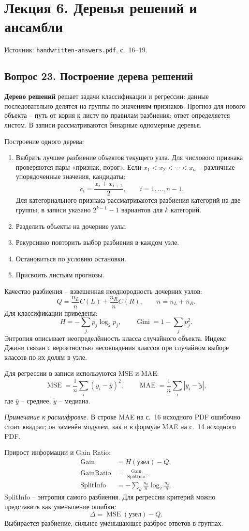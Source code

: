 \documentclass[11pt,a4paper]{article}
\newcommand{\source}[1]{{\small\color{muted}Источник: \texttt{handwritten-answers.pdf}, с.~#1.}\par}
\newcommand{\ednote}[1]{\par{\small\color{muted}\textit{Примечание к расшифровке.} #1}\par}
\newcommand{\question}[2]{\subsection{Вопрос #1. #2}}
\newcommand{\MSE}{\operatorname{MSE}}
\newcommand{\MAE}{\operatorname{MAE}}
\begin{document}
\clearpage
\section{Лекция 6. Деревья решений и ансамбли}
\source{16--19}

\question{23}{Построение дерева решений}
\textbf{Дерево решений} решает задачи классификации и регрессии:
данные последовательно делятся на группы по значениям признаков.
Прогноз для нового объекта -- путь от корня к листу по правилам разбиения;
ответ определяется листом. В записи рассматриваются бинарные одномерные деревья.

Построение одного дерева:
\begin{enumerate}
\item Выбрать лучшее разбиение объектов текущего узла.
Для числового признака проверяются пары «признак, порог».
Если $x_1<x_2<\cdots<x_n$ -- различные упорядоченные значения, кандидаты:
\[
 c_i=\frac{x_i+x_{i+1}}2,\qquad i=1,\ldots,n-1.
\]
Для категориального признака рассматриваются разбиения категорий на две группы;
в записи указано $2^{k-1}-1$ вариантов для $k$ категорий.
\item Разделить объекты на дочерние узлы.
\item Рекурсивно повторить выбор разбиения в каждом узле.
\item Остановиться по условию остановки.
\item Присвоить листьям прогнозы.
\end{enumerate}

Качество разбиения -- взвешенная неоднородность дочерних узлов:
\[
 Q=\frac{n_L}{n}C(L)+\frac{n_R}{n}C(R),\qquad n=n_L+n_R.
\]
Для классификации приведены:
\[
 H=-\sum_jp_j\log_2p_j,\qquad
 \operatorname{Gini}=1-\sum_jp_j^2.
\]
Энтропия описывает неопределённость класса случайного объекта.
Индекс Джини связан с вероятностью несовпадения классов при случайном выборе
классов по их долям в узле.

Для регрессии в записи используются MSE и MAE:
\[
 \MSE=\frac1n\sum_i(y_i-\bar y)^2,\qquad
 \MAE=\frac1n\sum_i|y_i-\widetilde y|,
\]
где $\bar y$ -- среднее, $\widetilde y$ -- медиана.
\ednote{В строке MAE на с.~16 исходного PDF ошибочно стоит квадрат;
он заменён модулем, как и в формуле MAE на с.~14 исходного PDF.}

Прирост информации и Gain Ratio:
\begin{align*}
 \operatorname{Gain}&=H(\text{узел})-Q,\\
 \operatorname{GainRatio}&=\frac{\operatorname{Gain}}{\operatorname{SplitInfo}},\\
 \operatorname{SplitInfo}&=-\sum_k\frac{n_k}{n}\log_2\frac{n_k}{n}.
\end{align*}
SplitInfo -- энтропия самого разбиения. Для регрессии критерий можно
представить как уменьшение ошибки:
\[
 \Delta=\MSE(\text{узел})-Q.
\]
Выбирается разбиение, сильнее уменьшающее разброс ответов в группах.
\end{document}
